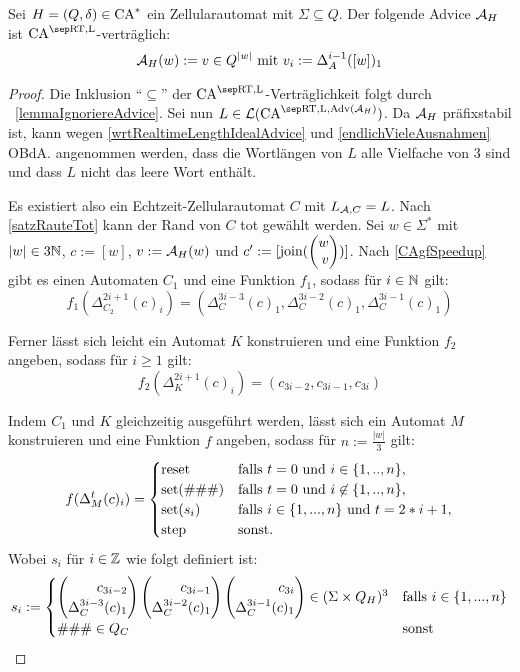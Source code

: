 \begin{theorem}
    \label{thmAdviceMain}
    Sei $H = (Q, \delta) \in \textrm{CA}^*$ ein Zellularautomat mit $\Sigma \subseteq Q$.
    Der folgende Advice $\mathcal{A}_H$ ist $\CAM{\CART, \CALeft}$-verträglich:
    \[
        \mathcal{A}_H(w) := v \in Q^{|w|} \text{ mit } v_i := \Delta_A^{i-1}([w])_1 \\
    \]
\end{theorem}
\begin{proof}
    Die Inklusion \enquote{$\subseteq$} der $\CAM{\CART, \CALeft}$-Verträglichkeit folgt durch ~\cref{lemmaIgnoriereAdvice}.
    Sei nun $L \in \CAL{\CART, \CALeft, \orakel({\advA_H})}$.
    Da $\mathcal{A}_H$ präfixstabil ist, kann wegen \cref{wrtRealtimeLengthIdealAdvice} und \cref{endlichVieleAusnahmen}
    \acs{OBdA.} angenommen werden,
    dass die Wortlängen von $L$ alle Vielfache von $3$ sind und dass $L$ nicht das leere Wort enthält.

    Es existiert also ein Echtzeit-Zellularautomat $C$ mit $L_{\mathcal{A}, C} = L$. Nach \cref{satzRauteTot} kann der Rand von $C$ tot gewählt werden.
    Sei $w \in \Sigma^*$ mit $|w| \in 3\mathbb{N}$, $c := [w]$, $v := \mathcal{A}_H(w)$ und $c' := [\joinw(\Spvek{ w; v})]$.
    Nach \cref{CAgfSpeedup} gibt es einen Automaten $C_1$ und eine Funktion $f_1$, sodass für $i \in \mathbb{N}$ gilt:
    \[
        f_1(\Delta_{C_2}^{2i+1}(c)_i) = (\Delta_C^{3i-3}(c)_1, \Delta_C^{3i-2}(c)_1, \Delta_C^{3i-1}(c)_1)
    \]
    
    Ferner lässt sich leicht ein Automat $K$ konstruieren und eine Funktion $f_2$ angeben, sodass für $i \geq 1$ gilt:
    \[
        f_2(\Delta_{K}^{2i+1}(c)_i) = (c_{3i-2}, c_{3i-1}, c_{3i})
    \]
    
    Indem $C_1$ und $K$ gleichzeitig ausgeführt werden, lässt sich ein Automat $M$ konstruieren und eine Funktion $f$ angeben,
    sodass für $n := \frac{|w|}{3}$ gilt:
    \[
        f(\Delta_M^t(c)_i) =
        \begin{cases}
            \mathrm{reset} & \text{falls } t = 0 \text{ und } i \in \{ {1, .., n} \}, \\
            \mathrm{set}(\#\#\#) & \text{falls } t = 0 \text{ und } i \not\in \{ {1, .., n} \}, \\
            \mathrm{set}(s_i)
                & \text{falls } i \in \{ {1, ..., n} \} \text{ und } t = 2 * i + 1, \\
            \mathrm{step} & \text{sonst.}
        \end{cases}
    \]
    Wobei $s_i$ für $i \in \mathbb{Z}$ wie folgt definiert ist:
    \[
        s_i := \begin{cases}
                    \Spvek{ c_{3i-2} ; \Delta_C^{3i-3}(c)_1 }
                        \Spvek{ c_{3i-1} ; \Delta_C^{3i-2}(c)_1} 
                        \Spvek{ c_{3i} ; \Delta_C^{3i-1}(c)_1}
                        \in (\Sigma \times Q_H)^3
                        & \text{falls } i \in \finset{ 1, ..., n } \\
                    \#\#\# \in Q_C & \text{sonst} 
                \end{cases}
    \]
    

\end{proof}
